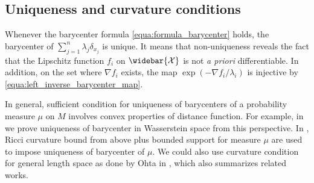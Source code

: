 \subsection{Uniqueness and curvature conditions}

\label{section:uniqueness_and_curvature}

Whenever the barycenter formula \cref{equa:formula_barycenter} holds,
the barycenter of $\sum_{j=1}^n \lambda_j \delta_{x_j}$ is unique.
It means that non-uniqueness reveals the fact that the Lipschitz function
$f_i$ on $\widebar{ \mathcal{X} }$ is not \emph{a priori} differentiable.
In addition, on the set where $\nabla f_i$ exists, the map
$\exp( -\nabla f_i / \lambda_i )$ is injective by \cref{equa:left_inverse_barycenter_map}.

In general, sufficient condition for uniqueness of barycenters of a probability measure $\mu$ on $M$
involves convex properties of distance function.
For example, in  we prove uniqueness of barycenter in Wasserstein space
from this perspective.
In \cite[Proposition IX.7.1]{chavel2006riemannian},
Ricci curvature bound from above plus bounded support for measure $\mu$ are used
to impose uniqueness of barycenter of $\mu$.
We could also use curvature condition for general length space as done by Ohta in \cite{ohta2012barycenters},
which also summarizes related works.
